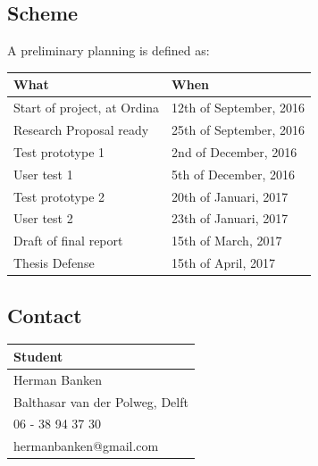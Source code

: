 \documentclass[11pt,a4paper]{article}
\begin{document}
\subsection{Scheme} A preliminary planning is defined as:
\begin{table}[h]
    \centering
    \begin{tabular}{@{}ll@{}}
        \textbf{What}               & \textbf{When}           \\ 
        \hline
        Start of project, at Ordina & 12th of September, 2016 \\ 
        Research Proposal ready     & 25th of September, 2016 \\ 
        \hline
        Test prototype 1            & 2nd of December, 2016   \\ 
        User test 1                 & 5th of December, 2016   \\ 
        \hline
        Test prototype 2            & 20th of Januari, 2017   \\ 
        User test 2                 & 23th of Januari, 2017   \\ 
        \hline
        Draft of final report       & 15th of March, 2017     \\ 
        \hline
        Thesis Defense              & 15th of April, 2017     \\ 
    \end{tabular}
\end{table}

\subsection{Contact}

\begin{table}[h]
    \centering
    \begin{tabular}{@{}l@{}}
        \textbf{Student}                \\ 
        \hline
        Herman Banken                   \\ 
        Balthasar van der Polweg, Delft \\ 
        06 - 38 94 37 30                \\ 
        hermanbanken@gmail.com          \\ 
    \end{tabular}
\end{table}
\end{document}
